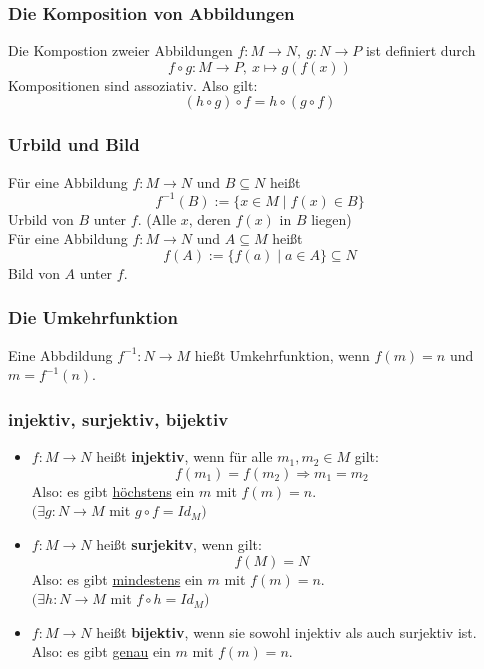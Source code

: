 \documentclass{kit}
\begin{document}
    \subsubsection{Die Komposition von Abbildungen}
      Die Kompostion zweier Abbildungen $f:M\longrightarrow N,\ g:N\longrightarrow P$ ist definiert durch 
      \[f\circ g: M\longrightarrow P,\ x\mapsto g(f(x))\]
      Kompositionen sind assoziativ. Also gilt:
      \[(h\circ g)\circ f=h\circ(g\circ f)\]
    \subsubsection{Urbild und Bild}
      Für eine Abbildung $f:M\longrightarrow N$ und $B\subseteq N$ heißt 
      \[f^{-1}(B):=\{x\in M\mid f(x)\in B\}\]
      Urbild von $B$ unter $f$. (Alle $x$, deren $f(x)$ in $B$ liegen)\\
      Für eine Abbildung $f:M\longrightarrow N$ und $A\subseteq M$ heißt
      \[f(A):=\{f(a)\mid a\in A\}\subseteq N\]
      Bild von $A$ unter $f$.
    \subsubsection{Die Umkehrfunktion}
      Eine Abbdildung $f^{-1}:N\longrightarrow M$ hießt Umkehrfunktion, wenn $f(m)=n$ und $m=f^{-1}(n)$.
    \subsubsection{injektiv, surjektiv, bijektiv}
      \begin{itemize}
        \item $f:M\longrightarrow N$ heißt \textbf{injektiv}, wenn für alle $m_1,m_2\in M$ gilt: 
          \[f(m_1)=f(m_2)\Rightarrow m_1=m_2\]
          Also: es gibt \underline{höchstens} ein $m$ mit $f(m)=n$.\\
          $(\exists g:N\longrightarrow M$ mit $g\circ f=Id_M)$
        \item $f:M\longrightarrow N$ heißt \textbf{surjekitv}, wenn gilt:
          \[f(M)=N\]
          Also: es gibt \underline{mindestens} ein $m$ mit $f(m)=n$.\\
          $(\exists h:N\longrightarrow M$ mit $f\circ h=Id_M)$
        \item $f:M\longrightarrow N$ heißt \textbf{bijektiv}, wenn sie sowohl injektiv als auch surjektiv ist.\\
          Also: es gibt \underline{genau} ein $m$ mit $f(m)=n$.
      \end{itemize}
\end{document}
